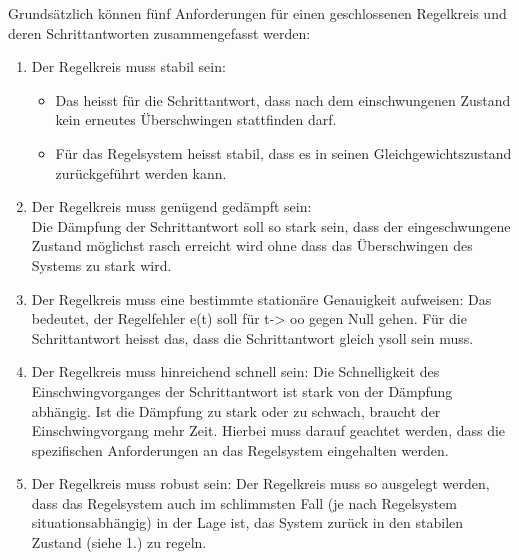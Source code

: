 Grundsätzlich können fünf Anforderungen für einen geschlossenen Regelkreis und deren Schrittantworten zusammengefasst werden:\\
\begin{enumerate}
\item Der Regelkreis muss stabil sein: 
	\begin{itemize}
		\item Das heisst für die Schrittantwort, dass nach dem einschwungenen Zustand kein erneutes Überschwingen stattfinden darf. 
		\item Für das Regelsystem heisst stabil, dass es in seinen Gleichgewichtszustand zurückgeführt werden kann.
	\end{itemize}
\item  Der Regelkreis muss genügend gedämpft sein: \\Die Dämpfung der Schrittantwort soll so stark sein, dass der eingeschwungene Zustand möglichst rasch erreicht wird ohne dass das Überschwingen des Systems zu stark wird.
\item Der Regelkreis muss eine bestimmte stationäre Genauigkeit
aufweisen: Das bedeutet, der Regelfehler e(t) soll für t-> oo gegen Null gehen. Für die Schrittantwort heisst das, dass die Schrittantwort gleich ysoll sein muss.
\item Der Regelkreis muss hinreichend schnell sein: Die Schnelligkeit des Einschwingvorganges der Schrittantwort ist stark von der Dämpfung abhängig. Ist die Dämpfung zu stark oder zu schwach, braucht der Einschwingvorgang mehr Zeit. Hierbei muss darauf geachtet werden, dass die spezifischen Anforderungen an das Regelsystem eingehalten werden.
\item Der Regelkreis muss robust sein: Der Regelkreis muss so ausgelegt werden, dass das Regelsystem auch im schlimmsten Fall (je nach Regelsystem situationsabhängig) in der Lage ist, das System zurück in den stabilen Zustand (siehe 1.) zu regeln.
\end{enumerate}
